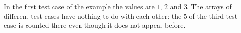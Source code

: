 In the first test case of the example the values are $1$, $2$ and $3$. The arrays of different test cases have nothing to do with each other: the $5$ of the third test case is counted there even though it does not appear before.

